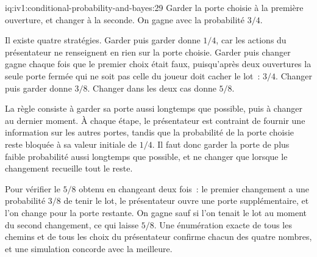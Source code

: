 \begin{solution}{iq:iv1:conditional-probability-and-bayes:29}
Garder la porte choisie à la première ouverture, et changer à la seconde. On gagne avec la probabilité $3/4$.

Il existe quatre stratégies. Garder puis garder donne $1/4$, car les actions du présentateur ne renseignent en rien sur la porte choisie. Garder puis changer gagne chaque fois que le premier choix était faux, puisqu'après deux ouvertures la seule porte fermée qui ne soit pas celle du joueur doit cacher le lot~: $3/4$. Changer puis garder donne $3/8$. Changer dans les deux cas donne $5/8$.

La règle consiste à garder sa porte aussi longtemps que possible, puis à changer au dernier moment. À chaque étape, le présentateur est contraint de fournir une information sur les autres portes, tandis que la probabilité de la porte choisie reste bloquée à sa valeur initiale de $1/4$. Il faut donc garder la porte de plus faible probabilité aussi longtemps que possible, et ne changer que lorsque le changement recueille tout le reste.

Pour vérifier le $5/8$ obtenu en changeant deux fois~: le premier changement a une probabilité $3/8$ de tenir le lot, le présentateur ouvre une porte supplémentaire, et l'on change pour la porte restante. On gagne sauf si l'on tenait le lot au moment du second changement, ce qui laisse $5/8$. Une énumération exacte de tous les chemins et de tous les choix du présentateur confirme chacun des quatre nombres, et une simulation concorde avec la meilleure.

\end{solution}


